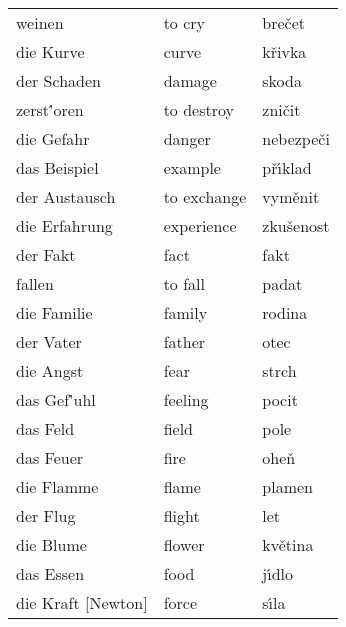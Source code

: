 \documentclass[11pt]{article}
\begin{document}
\begin{longtable}{lll}
 weinen                           &  to cry                   &  bre\v cet           \\
 die Kurve                        &  curve                    &  k\v rivka           \\
 der Schaden                      &  damage                   &  skoda               \\
 zerst\''oren                     &  to destroy               &  zni\v cit           \\
 die Gefahr                       &  danger                   &  nebezpe\v ci        \\
 das Beispiel                     &  example                  &  p\v r\'\i klad      \\
 der Austausch                    &  to exchange              &  vym\v enit          \\
 die Erfahrung                    &  experience               &  zku\v senost        \\
 der Fakt                         &  fact                     &  fakt                \\
 fallen                           &  to fall                  &  padat               \\
 die Familie                      &  family                   &  rodina              \\
 der Vater                        &  father                   &  otec                \\
 die Angst                        &  fear                     &  strch               \\
 das Gef\''uhl                    &  feeling                  &  pocit               \\
 das Feld                         &  field                    &  pole                \\
 das Feuer                        &  fire                     &  ohe\v n             \\
 die Flamme                       &  flame                    &  plamen              \\
 der Flug                         &  flight                   &  let                 \\
 die Blume                        &  flower                   &  kv\v etina          \\
 das Essen                        &  food                     &  j\'\i dlo           \\
 die Kraft [Newton]               &  force                    &  s\'\i la            \\

\end{longtable}
\end{document}
